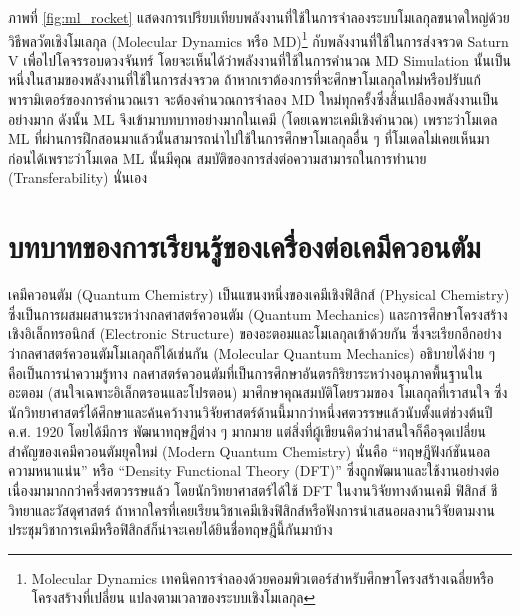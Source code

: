 ภาพที่ \ref{fig:ml_rocket} แสดงการเปรียบเทียบพลังงานที่ใช้ในการจำลองระบบโมเลกุลขนาดใหญ่ด้วยวิธีพลวัตเชิงโมเลกุล (Molecular 
Dynamics หรือ MD)\footnote{Molecular Dynamics เทคนิคการจำลองด้วยคอมพิวเตอร์สำหรับศึกษาโครงสร้างเฉลี่ยหรือโครงสร้างที่เปลี่ยน%
แปลงตามเวลาของระบบเชิงโมเลกุล} กับพลังงานที่ใช้ในการส่งจรวด Saturn V เพื่อไปโคจรรอบดวงจันทร์ โดยจะเห็นได้ว่าพลังงานที่ใช้ในการคำนวณ 
MD Simulation นั้นเป็นหนึ่งในสามของพลังงานที่ใช้ในการส่งจรวด ถ้าหากเราต้องการที่จะศึกษาโมเลกุลใหม่หรือปรับแก้พารามิเตอร์ของการคำนวณเรา%
จะต้องคำนวณการจำลอง MD ใหม่ทุกครั้งซึ่งสิ้นเปลืองพลังงานเป็นอย่างมาก ดังนั้น ML จึงเข้ามาบทบาทอย่างมากในเคมี (โดยเฉพาะเคมีเชิงคำนวณ) 
เพราะว่าโมเดล ML ที่ผ่านการฝึกสอนมาแล้วนั้นสามารถนำไปใช้ในการศึกษาโมเลกุลอื่น ๆ ที่โมเดลไม่เคยเห็นมาก่อนได้เพราะว่าโมเดล ML นั้นมีคุณ%
สมบัติของการส่งต่อความสามารถในการทำนาย (Transferability) นั่นเอง

\section{บทบาทของการเรียนรู้ของเครื่องต่อเคมีควอนตัม}
\label{sec:ml_in_qm}

เคมีควอนตัม (Quantum Chemistry) เป็นแขนงหนึ่งของเคมีเชิงฟิสิกส์ (Physical Chemistry) ซึ่งเป็นการผสมผสานระหว่างกลศาสตร์ควอนตัม 
(Quantum Mechanics) และการศึกษาโครงสร้างเชิงอิเล็กทรอนิกส์ (Electronic Structure) ของอะตอมและโมเลกุลเข้าด้วยกัน 
ซึ่งจะเรียกอีกอย่างว่ากลศาสตร์ควอนตัมโมเลกุลก็ได้เช่นกัน (Molecular Quantum Mechanics) อธิบายได้ง่าย ๆ คือเป็นการนำความรู้ทาง%
กลศาสตร์ควอนตัมที่เป็นการศึกษาอันตรกิริยาระหว่างอนุภาคพื้นฐานในอะตอม (สนใจเฉพาะอิเล็กตรอนและโปรตอน) มาศึกษาคุณสมบัติโดยรวมของ%
โมเลกุลที่เราสนใจ ซึ่งนักวิทยาศาสตร์ได้ศึกษาและค้นคว้างานวิจัยศาสตร์ด้านนี้มากว่าหนึ่งศตวรรษแล้วนับตั้งแต่ช่วงต้นปี ค.ศ. 1920 โดยได้มีการ%
พัฒนาทฤษฎีต่าง ๆ มากมาย แต่สิ่งที่ผู้เขียนคิดว่าน่าสนใจก็คือจุดเปลี่ยนสำคัญของเคมีควอนตัมยุคใหม่ (Modern Quantum Chemistry) นั่นคือ 
\enquote{ทฤษฎีฟังก์ชันนอลความหนาแน่น} หรือ \enquote{Density Functional Theory (DFT)}\autocite{kohn1996} 
ซึ่งถูกพัฒนาและใช้งานอย่างต่อเนื่องมามากกว่าครึ่งศตวรรษแล้ว โดยนักวิทยาศาสตร์ได้ใช้ DFT ในงานวิจัยทางด้านเคมี ฟิสิกส์ ชีวิทยาและวัสดุศาสตร์ 
ถ้าหากใครที่เคยเรียนวิชาเคมีเชิงฟิสิกส์หรือฟังการนำเสนอผลงานวิจัยตามงานประชุมวิชาการเคมีหรือฟิสิกส์ก็น่าจะเคยได้ยินชื่อทฤษฎีนี้กันมาบ้าง 


